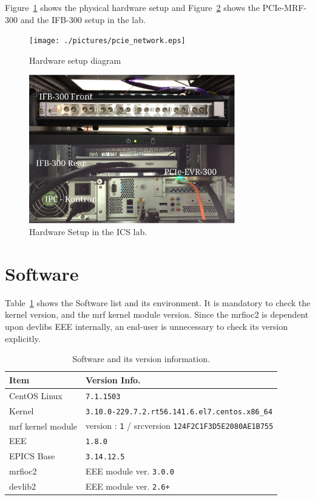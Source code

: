 \documentclass[11pt
  , a4paper
  , article
  , oneside
  , showtrims
]{memoir}
\begin{document}
Figure~\ref{fig:diagram} shows the physical hardware setup and Figure~\ref{fig:hw-setup} shows the PCIe-MRF-300 and the IFB-300 setup in the lab. 
\begin{figure}[!t]
  \centering
    \texttt{[image: ./pictures/pcie\_network.eps]}
  \caption{Hardware setup diagram}
  \label{fig:diagram}
\end{figure}
\begin{figure}[!b]
  \centering
  \includegraphics[width=0.8\textwidth]{./pictures/hw-setup.eps}
  \caption{Hardware Setup in the ICS lab.}
  \label{fig:hw-setup}   
\end{figure}


\clearpage
\section{Software}
Table~\ref{table:swlist} shows the Software list and its environment. It is mandatory to check the kernel version, and the mrf kernel module version. Since the mrfioc2 is dependent upon devlibs EEE internally, an end-user is unnecessary to check its version explicitly. 
\begin{table}[!htb]
  \centering
  \begin{tabular}{l|l}
    \toprule
    Item               & Version Info.                                            \\\midrule
    CentOS Linux       & \texttt{7.1.1503}                                        \\\midrule
    Kernel             & \texttt{3.10.0-229.7.2.rt56.141.6.el7.centos.x86\_64}    \\\midrule
    mrf kernel module  & version : \texttt{1} / srcversion \texttt{124F2C1F3D5E2080AE1B755}     \\\midrule
    EEE                & \texttt{1.8.0}                                  \\\midrule
    EPICS Base         & \texttt{3.14.12.5}                              \\\midrule
    mrfioc2            & EEE module ver. \texttt{3.0.0}                  \\\midrule
    devlib2            & EEE module ver. \texttt{2.6+}                   \\\bottomrule
  \end{tabular}
  \caption[]{Software and its version information.}
  \label{table:swlist}
\end{table}
\end{document}
